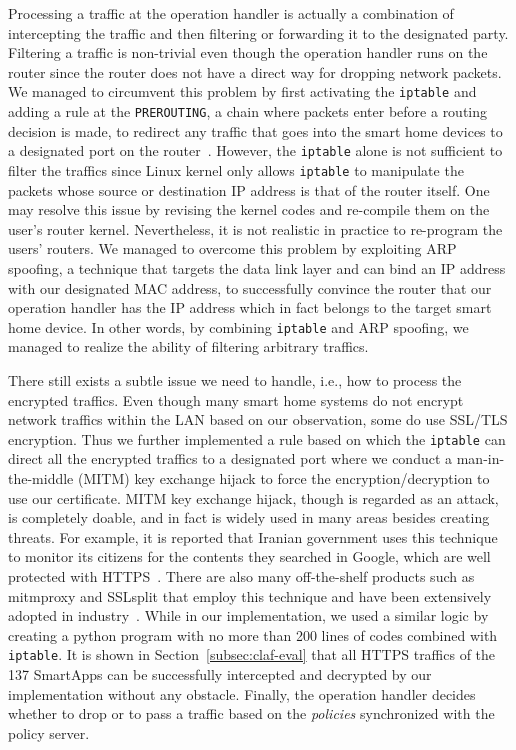 \documentclass[letterpaper,12pt]{article}
\begin{document}
Processing a traffic at the operation handler is actually a combination of intercepting the traffic %
and then filtering or forwarding it to the designated party. %
Filtering a traffic is non-trivial even though the operation handler runs on the router since the router does not have a direct way for dropping network packets. We managed to circumvent this problem by first activating the \texttt{iptable} and adding a rule at the \texttt{PREROUTING}, a chain where packets enter before a routing decision is made, to redirect any traffic that goes into the smart home devices to a designated port on the router~\cite{purdy2004linux}. However, the \texttt{iptable} alone is not sufficient to filter the traffics since Linux kernel only allows \texttt{iptable} to manipulate the packets whose source or destination IP address is that of the router itself. One may resolve this issue by revising the kernel codes and re-compile them on the user's router kernel. Nevertheless, it is not realistic in practice to re-program the users' routers. We managed to overcome this problem by exploiting ARP spoofing, a technique that targets the data link layer and can bind an IP address with our designated MAC address, to successfully convince the router that our operation handler has the IP address which in fact belongs to the target smart home device. In other words, by combining \texttt{iptable} and ARP spoofing, we managed to realize the ability of filtering arbitrary traffics. 

There still exists a subtle issue we need to handle, i.e., how to process the encrypted traffics. Even though many smart home systems do not encrypt network traffics within the LAN based on our observation, some do use SSL/TLS encryption. Thus we further implemented a rule based on which the \texttt{iptable} can direct all the encrypted traffics to a designated port where we conduct a man-in-the-middle (MITM) key exchange hijack to force the encryption/decryption to use our certificate.  MITM key exchange hijack, though is regarded as an attack, is completely doable, and in fact is widely used in many areas besides creating threats. For example, it is reported that Iranian government uses this technique to monitor its citizens for the contents they searched in Google, which are well protected with HTTPS~\cite{iranmitm}. There are also many off-the-shelf products such as mitmproxy and SSLsplit that employ this technique and have been extensively adopted in industry~\cite{mitmproducts}. While in our implementation, we used a similar logic by creating a python program with no more than 200 lines of codes combined with \texttt{iptable}. It is shown in Section~\ref{subsec:claf-eval} that all HTTPS traffics of the 137 SmartApps can be successfully intercepted and decrypted by our implementation without any obstacle. Finally, the operation handler decides whether to drop or to pass a traffic based on the \textit{policies} synchronized with the policy server.
\end{document}
